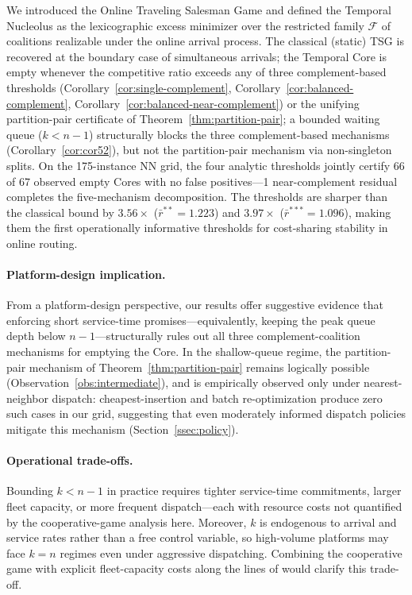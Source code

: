 \documentclass[11pt]{article}
\theoremstyle{plain}
\theoremstyle{definition}
\theoremstyle{remark}
\newcommand{\F}{\mathcal{F}}
\begin{document}
We introduced the Online Traveling Salesman Game and defined the Temporal Nucleolus as the lexicographic excess minimizer over the restricted family $\F$ of coalitions realizable under the online arrival process. The classical (static) TSG is recovered at the boundary case of simultaneous arrivals; the Temporal Core is empty whenever the competitive ratio exceeds any of three complement-based thresholds (Corollary~\ref{cor:single-complement}, Corollary~\ref{cor:balanced-complement}, Corollary~\ref{cor:balanced-near-complement}) or the unifying partition-pair certificate of Theorem~\ref{thm:partition-pair}; a bounded waiting queue ($k<n-1$) structurally blocks the three complement-based mechanisms (Corollary~\ref{cor:cor52}), but not the partition-pair mechanism via non-singleton splits. On the 175-instance NN grid, the four analytic thresholds jointly certify 66 of 67 observed empty Cores with no false positives---1 near-complement residual completes the five-mechanism decomposition. The thresholds are sharper than the classical bound by $3.56\times$ ($\bar r^{\ast\ast}=1.223$) and $3.97\times$ ($\bar r^{\ast\ast\ast}=1.096$), making them the first operationally informative thresholds for cost-sharing stability in online routing.

\paragraph{Platform-design implication.} From a platform-design perspective, our results offer suggestive evidence that enforcing short service-time promises---equivalently, keeping the peak queue depth below $n-1$---structurally rules out all three complement-coalition mechanisms for emptying the Core. In the shallow-queue regime, the partition-pair mechanism of Theorem~\ref{thm:partition-pair} remains logically possible (Observation~\ref{obs:intermediate}), and is empirically observed only under nearest-neighbor dispatch: cheapest-insertion and batch re-optimization produce zero such cases in our grid, suggesting that even moderately informed dispatch policies mitigate this mechanism (Section~\ref{ssec:policy}).

\paragraph{Operational trade-offs.} Bounding $k<n-1$ in practice requires tighter service-time commitments, larger fleet capacity, or more frequent dispatch---each with resource costs not quantified by the cooperative-game analysis here. Moreover, $k$ is endogenous to arrival and service rates rather than a free control variable, so high-volume platforms may face $k=n$ regimes even under aggressive dispatching. Combining the cooperative game with explicit fleet-capacity costs along the lines of \citet{ozener2008allocating} would clarify this trade-off.
\end{document}
